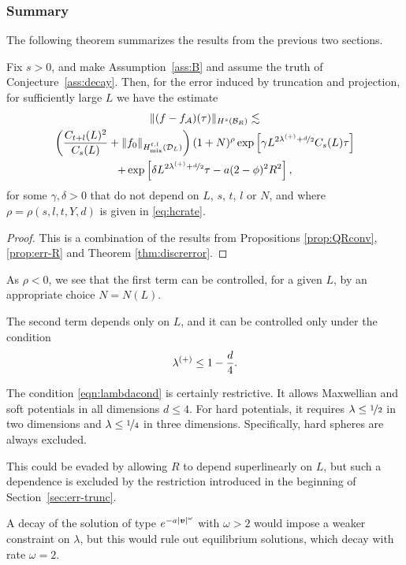 \subsubsection{Summary}

The following theorem summarizes the results from the previous two sections.

\begin{theorem} \label{thm:err}
    Fix $s>0$, and make Assumption~\ref{ass:B} and assume the truth of Conjecture~\ref{ass:decay}.
    Then, for the error induced by truncation and projection, for sufficiently
    large $L$ we have the estimate
    \begin{multline*}
        \|(f-f_{\mathcal{A}})(\tau)\|_{H^s(\mathcal{B}_R)} \lesssim \\
        \left(\frac{C_{t+l}(L)^2}{C_s(L)} +
        \|f_0\|_{{H}^{t,l}_\mathrm{mix}(\mathcal{D}_L)}\right)
        (1+N)^{\rho} \exp\left[\gamma L^{2\lambda^{(+)}+\nicefrac{d}{2}}C_s(L)\tau\right] \\
        + \exp\left[\delta L^{2\lambda^{(+)}+\nicefrac{d}{2}}\tau - a(2-\phi)^2R^2\right],
    \end{multline*}
    for some $\gamma,\delta>0$ that do not depend on $L$, $s$, $t$, $l$ or $N$,
    and where $\rho=\rho(s,l,t,Y,d)$ is given in \eqref{eq:hcrate}.
\end{theorem}
\begin{proof}
    This is a combination of the results from Propositions \ref{prop:QRconv},
    \ref{prop:err-R} and Theorem \ref{thm:discrerror}.
\end{proof}

As $\rho<0$, we see that the first term can be controlled, for a given $L$, by
an appropriate choice $N=N(L)$.

The second term depends only on $L$, and it can be controlled only under the
condition
\begin{equation} \label{eqn:lambdacond}
    \lambda^{(+)} \leq 1 - \frac{d}{4}.
\end{equation}
\begin{remark}
The condition \eqref{eqn:lambdacond} is certainly restrictive. It allows
Max\-wellian and soft potentials in all dimensions $d\leq4$. For hard potentials, it
requires $\lambda \leq \nicefrac12$ in two dimensions and $\lambda \leq
\nicefrac14$ in three dimensions. Specifically, hard spheres are always
excluded.

This could be evaded by allowing $R$ to depend superlinearly on $L$, but such
a dependence is excluded by the restriction introduced in the beginning of
Section~\ref{sec:err-trunc}.

A decay of the solution of type $e^{-a|{\bm v}|^\omega}$ with $\omega>2$ would
impose a weaker constraint on $\lambda$, but this would rule out
equilibrium solutions, which decay with rate $\omega=2$.
\end{remark}

